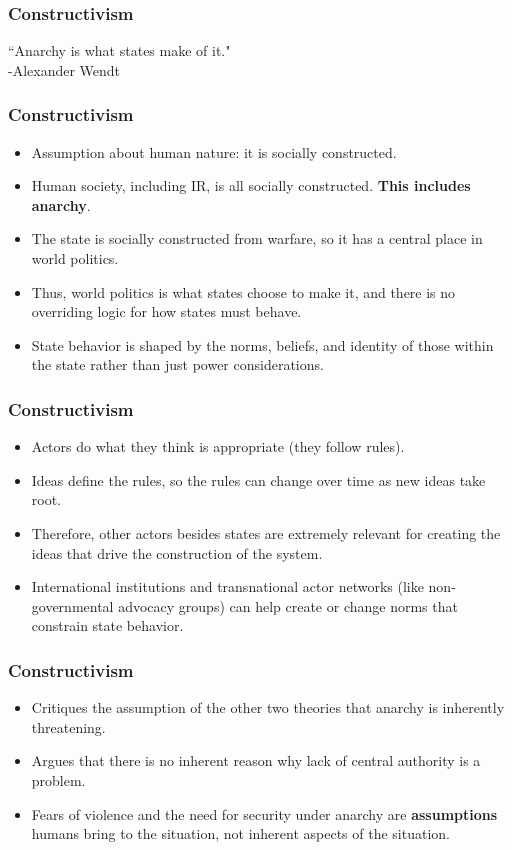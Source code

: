 \documentclass[handout]{beamer}
\begin{document}

\begin{frame} 
\frametitle{\LARGE{Constructivism}}
``Anarchy is what states make of it." \\
\hspace*{160pt} -Alexander Wendt
\end{frame}


\begin{frame} 
\frametitle{\LARGE{Constructivism}}
\begin{itemize}
    \item Assumption about human nature: it is socially constructed. \pause 
    \item Human society, including IR, is all socially constructed. \textbf{This includes anarchy}. \pause
    \item The state is socially constructed from warfare, so it has a central place in world politics. \pause
    \item Thus, world politics is what states choose to make it, and there is no overriding logic for how states must behave. \pause 
    \item State behavior is shaped by the norms, beliefs, and identity of those within the state rather than just power considerations.
\end{itemize}
\end{frame}

\begin{frame} 
\frametitle{\LARGE{Constructivism}}
    \begin{itemize}
        \item Actors do what they think is appropriate (they follow rules). \pause 
        \item Ideas define the rules, so the rules can change over time as new ideas take root. \pause 
        \item Therefore, other actors besides states are extremely relevant for creating the ideas that drive the construction of the system. \pause
        \item International institutions and transnational actor networks (like non-governmental advocacy groups) can help create or change norms that constrain state behavior.
    \end{itemize}
\end{frame}

\begin{frame} 
	\frametitle{\LARGE{Constructivism}}
	\begin{itemize}
		\item Critiques the assumption of the other two theories that anarchy is inherently threatening.
		\item Argues that there is no inherent reason why lack of central authority is a problem. \pause
		\item Fears of violence and the need for security under anarchy are \textbf{assumptions} humans bring to the situation, not inherent aspects of the situation. 
	\end{itemize}
\end{frame}
\end{document}
